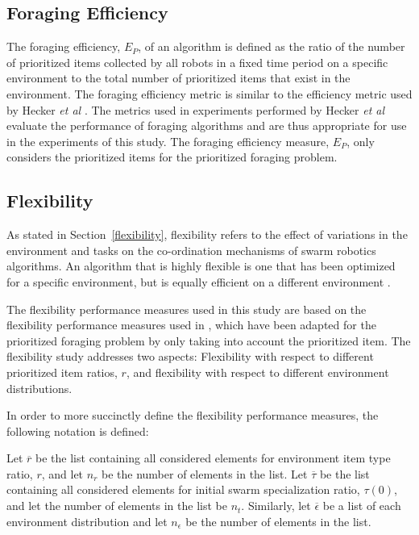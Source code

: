 \documentclass[preprint,12pt]{elsarticle}
\begin{document}
\subsection{Foraging Efficiency}
\label{setup:foragingefficiency}
The foraging efficiency, $E_P$, of an algorithm is defined as the ratio of the number of prioritized items collected by all robots in a fixed time period on a specific environment to the total number of prioritized items that exist in the environment. The foraging efficiency metric is similar to the efficiency metric used by Hecker \textit{et al} \cite{hecker2015beyond}. The metrics used in experiments performed by Hecker \textit{et al} evaluate the performance of foraging algorithms and are thus appropriate for use in the experiments of this study. The foraging efficiency measure, $E_P$, only considers the prioritized items for the prioritized foraging problem.


\subsection{Flexibility}
\label{setup:flexibility}

As stated in Section~\ref{flexibility}, flexibility refers to the effect of variations in the environment and tasks on the co-ordination mechanisms of swarm robotics algorithms. An algorithm that is highly flexible is one that has been optimized for a specific environment, but is equally efficient on a different environment \cite{hecker2015beyond}.

The flexibility performance measures used in this study are based on the flexibility performance measures used in \cite{hecker2015beyond}, which have been adapted for the prioritized foraging problem by only taking into account the prioritized item. The flexibility study addresses two aspects: Flexibility with respect to different prioritized item ratios, $r$, and flexibility with respect to different environment distributions.

In order to more succinctly define the flexibility performance measures, the following notation is defined:

Let $\overline{r}$ be the list containing all considered elements for environment item type ratio, $r$, and let $n_r$ be the number of elements in the list. Let $\overline{\tau}$ be the list containing all considered elements for initial swarm specialization ratio, $\tau(0)$, and let the number of elements in the list be $n_t$. Similarly, let $\overline{\epsilon}$ be a list of each environment distribution and let $n_\epsilon$ be the number of elements in the list.
\end{document}
